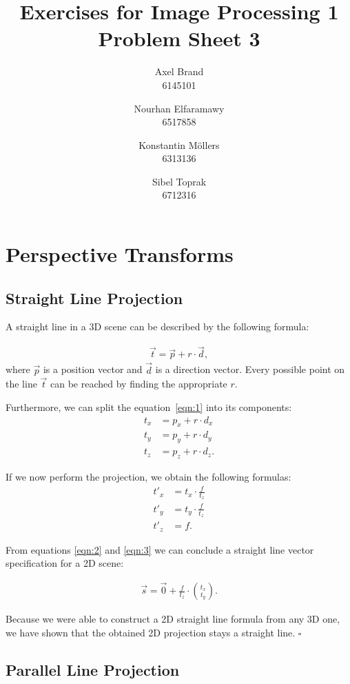 \documentclass[a4paper,12pt]{article}
\title{\textbf{Exercises for Image Processing 1}\\Problem Sheet 3}
\author{Axel Brand\\6145101 \and Nourhan Elfaramawy\\6517858 \and Konstantin M\"ollers\\6313136 \and Sibel Toprak\\6712316}
\begin{document}
	\maketitle
	
	\section{Perspective Transforms}
	
	\subsection{Straight Line Projection}
	
	A straight line in a 3D scene can be described by the following formula:
	
	\begin{align}\label{eqn:1} \vec{t} = \vec{p} + r \cdot \vec{d},\end{align}
	where $\vec{p}$ is a position vector and $\vec{d}$ is a direction vector. Every possible point on the line $\vec{t}$ can be reached by finding the appropriate $r$.
	
	Furthermore, we can split the equation~\ref{eqn:1} into its components:
	\begin{align}
		t_x &= p_x + r \cdot d_x \\
		t_y &= p_y + r \cdot d_y \\
		t_z &= p_z + r \cdot d_z.
	\end{align}
	
	If we now perform the projection, we obtain the following formulas:
	\begin{align}
		\label{eqn:2} t'_{x} &= t_x \cdot \frac{f}{t_z} \\
		\label{eqn:3}t'_{y} &= t_y \cdot \frac{f}{t_z}\\
		t'_{z} &= f.
	\end{align}
	
	From equations \ref{eqn:2} and \ref{eqn:3} we can conclude a straight line vector specification for a 2D scene:
	
	\begin{align}\label{eqn:4} \vec{s} = \vec{0} + \frac{f}{t_z} \cdot \binom{t_x}{t_y}.\end{align}
	
	Because we were able to construct a 2D straight line formula from any 3D one, we have shown that the obtained 2D projection stays a straight line. $\square$
	
	\subsection{Parallel Line Projection}
	
\end{document}
